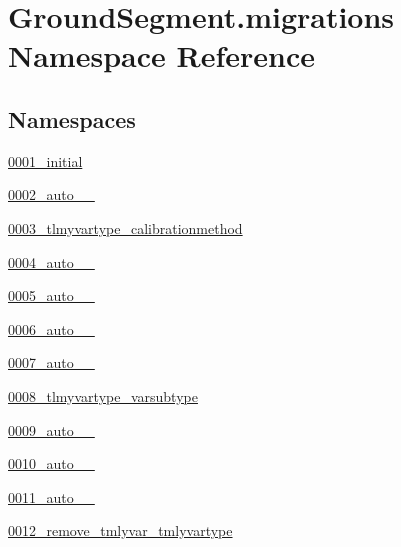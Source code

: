 \hypertarget{namespace_ground_segment_1_1migrations}{}\section{Ground\+Segment.\+migrations Namespace Reference}
\label{namespace_ground_segment_1_1migrations}
\subsection*{Namespaces}
\begin{DoxyCompactItemize}
\item 
 \hyperlink{namespace_ground_segment_1_1migrations_1_10001__initial}{0001\+\_\+initial}
\item 
 \hyperlink{namespace_ground_segment_1_1migrations_1_10002__auto__20161126__1037}{0002\+\_\+auto\+\_\+\_}
\item 
 \hyperlink{namespace_ground_segment_1_1migrations_1_10003__tlmyvartype__calibrationmethod}{0003\+\_\+tlmyvartype\+\_\+calibrationmethod}
\item 
 \hyperlink{namespace_ground_segment_1_1migrations_1_10004__auto__20161126__1516}{0004\+\_\+auto\+\_\+\_}
\item 
 \hyperlink{namespace_ground_segment_1_1migrations_1_10005__auto__20161126__1606}{0005\+\_\+auto\+\_\+\_}
\item 
 \hyperlink{namespace_ground_segment_1_1migrations_1_10006__auto__20161126__1611}{0006\+\_\+auto\+\_\+\_}
\item 
 \hyperlink{namespace_ground_segment_1_1migrations_1_10007__auto__20161126__1841}{0007\+\_\+auto\+\_\+\_}
\item 
 \hyperlink{namespace_ground_segment_1_1migrations_1_10008__tlmyvartype__varsubtype}{0008\+\_\+tlmyvartype\+\_\+varsubtype}
\item 
 \hyperlink{namespace_ground_segment_1_1migrations_1_10009__auto__20161126__1856}{0009\+\_\+auto\+\_\+\_}
\item 
 \hyperlink{namespace_ground_segment_1_1migrations_1_10010__auto__20161127__2017}{0010\+\_\+auto\+\_\+\_}
\item 
 \hyperlink{namespace_ground_segment_1_1migrations_1_10011__auto__20161127__2019}{0011\+\_\+auto\+\_\+\_}
\item 
 \hyperlink{namespace_ground_segment_1_1migrations_1_10012__remove__tmlyvar__tmlyvartype}{0012\+\_\+remove\+\_\+tmlyvar\+\_\+tmlyvartype}

\end{DoxyCompactItemize}
